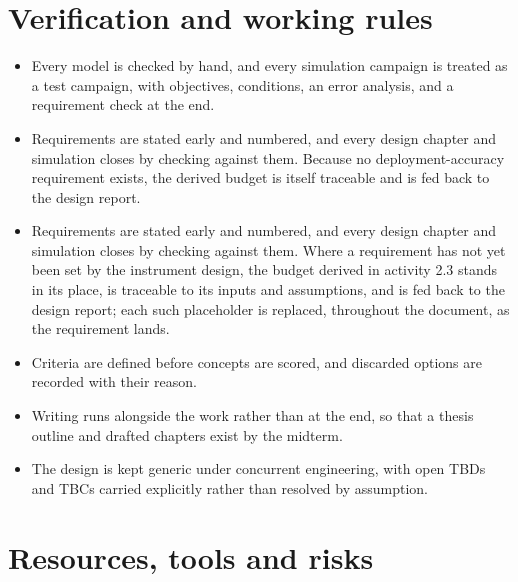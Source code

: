 \section{Verification and working rules}
\label{sec:verification}

\begin{itemize}
    \item Every model is checked by hand, and every simulation campaign is treated as a test campaign, with objectives, conditions, an error analysis, and a requirement check at the end.
    
    \item Requirements are stated early and numbered, and every design chapter and simulation closes by checking against them. Because no deployment-accuracy requirement exists, the derived budget is itself traceable and is fed back to the design report.
    \item Requirements are stated early and numbered, and every design chapter and simulation closes by checking against them. Where a requirement has not yet been set by the instrument design, the budget derived in activity 2.3 stands in its place, is traceable to its inputs and assumptions, and is fed back to the design report; each such placeholder is replaced, throughout the document, as the requirement lands.
    
    \item Criteria are defined before concepts are scored, and discarded options are recorded with their reason.
    
    \item Writing runs alongside the work rather than at the end, so that a thesis outline and drafted chapters exist by the midterm.
    
    \item The design is kept generic under concurrent engineering, with open TBDs and TBCs carried explicitly rather than resolved by assumption.
\end{itemize}

\section{Resources, tools and risks}
\label{sec:risks}

